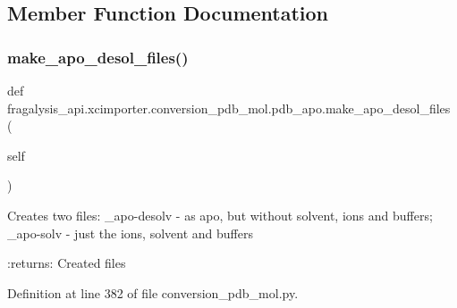 \subsection{Member Function Documentation}
\mbox{\label{classfragalysis__api_1_1xcimporter_1_1conversion__pdb__mol_1_1pdb__apo_ab88e88fe9d512e1635e5f1d61040f9f6}} 
\subsubsection{\texorpdfstring{make\+\_\+apo\+\_\+desol\+\_\+files()}{make\_apo\_desol\_files()}}
{\footnotesize\ttfamily def fragalysis\+\_\+api.\+xcimporter.\+conversion\+\_\+pdb\+\_\+mol.\+pdb\+\_\+apo.\+make\+\_\+apo\+\_\+desol\+\_\+files (\begin{DoxyParamCaption}\item[{}]{self }\end{DoxyParamCaption})}

\begin{DoxyVerb}Creates two files:
_apo-desolv - as apo, but without solvent, ions and buffers;
_apo-solv - just the ions, solvent and buffers

:returns: Created files
\end{DoxyVerb}
 

Definition at line 382 of file conversion\+\_\+pdb\+\_\+mol.\+py.


